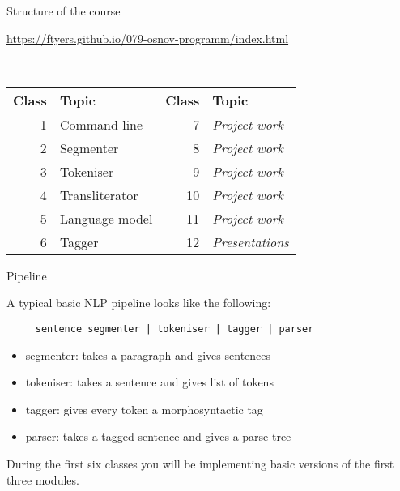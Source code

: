 \documentclass[10pt, compress]{beamer}
\begin{document}
\begin{frame}{Structure of the course}

\begin{center}
\url{https://ftyers.github.io/079-osnov-programm/index.html}
\end{center}
~\\
\begin{center}
\begin{tabular}{rlrl}
\textbf{Class} & \textbf{Topic}   & \textbf{Class} & \textbf{Topic} \\
\hline
1  & Command line & 7   & \emph{Project work}  \\
2  & Segmenter & 8   &  \emph{Project work} \\
3  & Tokeniser & 9   &  \emph{Project work} \\
4  & Transliterator & 10   &  \emph{Project work} \\
5  & Language model & 11   & \emph{Project work}  \\
6  & Tagger & 12   & \emph{Presentations}  \\
\end{tabular}
\end{center}


\end{frame}

\begin{frame}[fragile]{Pipeline}
 
A typical basic NLP pipeline looks like the following:

\begin{verbatim}
     sentence segmenter | tokeniser | tagger | parser
\end{verbatim}

\begin{itemize}
  \item segmenter: takes a paragraph and gives sentences
  \item tokeniser: takes a sentence and gives list of tokens
  \item tagger: gives every token a morphosyntactic tag
  \item parser: takes a tagged sentence and gives a parse tree
\end{itemize} 

During the first six classes you will be implementing basic
 versions of the first three modules.

\end{frame}
\end{document}
